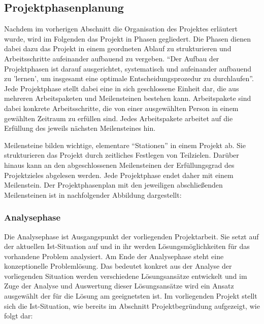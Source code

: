 \subsection{Projektphasenplanung}
\label{sec:Projektphasenplanung}

Nachdem im vorherigen Abschnitt die Organisation des Projektes erläutert wurde,
wird im Folgenden das Projekt in Phasen gegliedert. Die Phasen dienen dabei
dazu das Projekt in einem geordneten Ablauf zu strukturieren und
Arbeitsschritte aufeinander aufbauend zu vergeben. "`Der Aufbau der
Projektphasen ist darauf ausgerichtet, systematisch und aufeinander aufbauend
zu 'lernen', um insgesamt eine optimale Entscheidungsprozedur zu
durchlaufen"'.
Jede Projektphase stellt dabei eine in sich geschlossene Einheit dar, die aus
mehreren Arbeitspaketen und Meilensteinen bestehen kann. Arbeitspakete sind
dabei konkrete Arbeitsschritte, die von einer ausgewählten Person in einem
gewählten Zeitraum zu erfüllen sind. Jedes Arbeitspakete arbeitet auf die
Erfüllung des jeweils nächsten Meilensteines hin.

Meilensteine bilden wichtige, elementare "`Stationen"' in einem Projekt ab. Sie
strukturieren das Projekt durch zeitliches Festlegen von Teilzielen.
Darüber hinaus kann an den abgeschlossenen Meilensteinen
der Erfüllungsgrad des Projektzieles abgelesen werden.
Jede Projektphase endet daher mit einem Meilenstein. Der Projektphasenplan mit
den jeweiligen abschließenden Meilensteinen ist in nachfolgender Abbildung
dargestellt:


\subsubsection{Analysephase}
\label{sec:Analysephase}

Die Analysephase ist Ausgangspunkt der vorliegenden Projektarbeit. Sie setzt
auf der aktuellen Ist-Situation auf und in ihr werden Lösungsmöglichkeiten für
das vorhandene Problem analysiert. Am Ende der Analysephase steht eine
konzeptionelle Problemlösung. Das bedeutet konkret aus der Analyse der
vorliegenden Situation werden verschiedene Lösungsansätze entwickelt und im
Zuge der Analyse und Auswertung dieser Lösungsansätze wird ein Ansatz
ausgewählt der für die Lösung am geeignetsten ist.
Im vorliegenden Projekt stellt sich die Ist-Situation, wie bereits im Abschnitt
Projektbegründung aufgezeigt, wie folgt dar:

